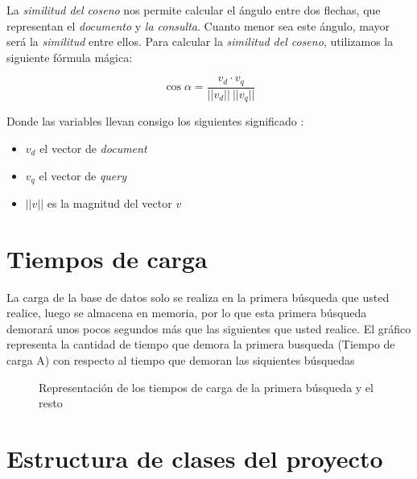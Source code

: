 \documentclass{article}
\begin{document}
\begin{center}
La {\it similitud del coseno} nos permite calcular el ángulo entre dos flechas, que representan el {\it documento} y {\it la consulta}.
 Cuanto menor sea este ángulo, mayor será la {\it similitud} entre ellos. Para calcular la {\it similitud del coseno}, utilizamos la siguiente fórmula mágica:

\begin{equation}
	\cos \alpha = \frac{v_d \cdot v_q}{||v_d|| ~ ||v_q||}
\end{equation}

Donde las variables llevan consigo los siguientes significado :

\begin{itemize}
	\item $v_d$ el vector de {\it document}
	\item $v_q$ el vector de {\it query}
	\item $||v||$ es la magnitud del vector $v$
\end{itemize}

\newpage

\section*{\textcolor{graphcolor}{{\centering Tiempos de carga}}}

La carga de la base de datos solo se realiza en la primera búsqueda que usted realice, luego se 
almacena en memoria, por lo que esta primera búsqueda demorará unos pocos segundos
más que las siguientes que usted realice. El gráfico representa la cantidad de tiempo que demora la primera busqueda (Tiempo de carga A) con respecto al tiempo que demoran las siquientes búsquedas

\begin{figure}[H]
  \centering
  \caption{Representación de los tiempos de carga de la primera búsqueda y el resto}
  \label{fig:grafico-barras}
\end{figure}

\newpage

\section*{\textcolor{graphcolor}{{\centering Estructura de clases del proyecto}}}


\end{center}
\end{document}
